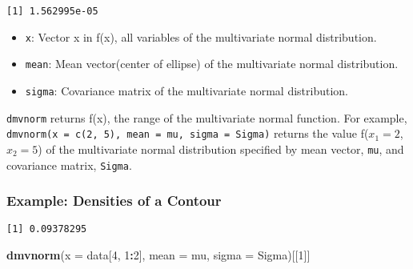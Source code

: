 \documentclass[]{book}
\newenvironment{Shaded}{\begin{snugshade}}{\end{snugshade}}
\newcommand{\KeywordTok}[1]{\textcolor[rgb]{0.13,0.29,0.53}{\textbf{#1}}}
\newcommand{\DataTypeTok}[1]{\textcolor[rgb]{0.13,0.29,0.53}{#1}}
\newcommand{\DecValTok}[1]{\textcolor[rgb]{0.00,0.00,0.81}{#1}}
\newcommand{\StringTok}[1]{\textcolor[rgb]{0.31,0.60,0.02}{#1}}
\newcommand{\OperatorTok}[1]{\textcolor[rgb]{0.81,0.36,0.00}{\textbf{#1}}}
\newcommand{\NormalTok}[1]{#1}
\providecommand{\tightlist}{%
  \setlength{\itemsep}{0pt}\setlength{\parskip}{0pt}}
\theoremstyle{definition}
\theoremstyle{definition}
\theoremstyle{definition}
\theoremstyle{remark}
\begin{document}
\begin{verbatim}
[1] 1.562995e-05
\end{verbatim}

\begin{itemize}
\tightlist
\item
  \texttt{x}: Vector x in f(x), all variables of the multivariate normal
  distribution.
\item
  \texttt{mean}: Mean vector(center of ellipse) of the multivariate
  normal distribution.
\item
  \texttt{sigma}: Covariance matrix of the multivariate normal
  distribution.
\end{itemize}

\texttt{dmvnorm} returns f(x), the range of the multivariate normal
function. For example,
\texttt{dmvnorm(x\ =\ c(2,\ 5),\ mean\ =\ mu,\ sigma\ =\ Sigma)} returns
the value f(\(x_1=2\), \(x_2=5\)) of the multivariate normal
distribution specified by mean vector, \texttt{mu}, and covariance
matrix, \texttt{Sigma}.

\subsubsection{Example: Densities of a
Contour}\label{example-densities-of-a-contour}

\begin{Shaded}
\end{Shaded}

\begin{verbatim}
[1] 0.09378295
\end{verbatim}

\begin{Shaded}
\begin{Highlighting}[]
\KeywordTok{dmvnorm}\NormalTok{(}\DataTypeTok{x =}\NormalTok{ data[}\DecValTok{4}\NormalTok{, }\DecValTok{1}\OperatorTok{:}\DecValTok{2}\NormalTok{], }\DataTypeTok{mean =}\NormalTok{ mu, }\DataTypeTok{sigma =}\NormalTok{ Sigma)[[}\DecValTok{1}\NormalTok{]]}
\end{Highlighting}
\end{Shaded}
\end{document}
